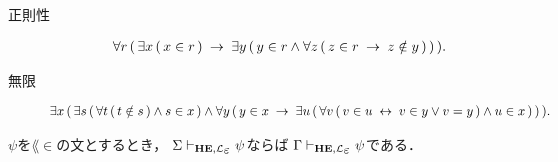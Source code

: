 \begin{description}
		\item[正則性] 
			\begin{align}
				\forall r\, (\, \exists x\, (\, x \in r\, ) \hspace{0.25em}\rightarrow\hspace{0.25em}
				\exists y\, (\, y \in r \wedge \forall z\, (\, z \in r \hspace{0.25em}\rightarrow\hspace{0.25em}
				z \notin y\, )\, )\, ).
			\end{align}
			
		\item[無限] 
			\begin{align}
				\exists x\, (\, 
				\exists s\, (\, \forall t\, (\, t \notin s\, ) \wedge s \in x\, ) 
				\wedge \forall y\, (\, 
				y \in x \hspace{0.25em}\rightarrow\hspace{0.25em} \exists u\, (\, 
				\forall v\, (\, v \in u \hspace{0.25em}\leftrightarrow\hspace{0.25em} v \in y \vee v = y\, )
				\wedge u \in x\, )\, )\, ).
			\end{align}
	\end{description}
	
	
	\begin{screen}
		\begin{metathm}
		\label{metathm:Henkin_expansion_3}
			$\psi$を$\lang{\in}$の文とするとき，
			$\Sigma \provable{\mbox{{\bf HE}},\lang{\varepsilon}} \psi$ならば
			$\Gamma \provable{\mbox{{\bf HE}},\lang{\varepsilon}} \psi$である．
		\end{metathm}
	\end{screen}
	
